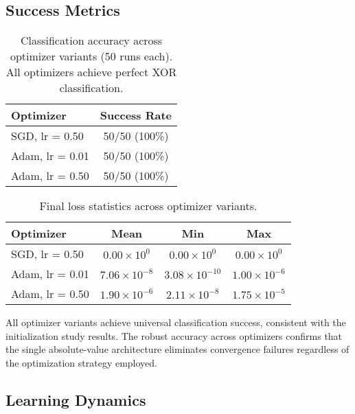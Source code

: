 
\subsection*{Success Metrics}

\begin{table}[ht]
\centering
\caption{Classification accuracy across optimizer variants (50 runs each). All optimizers achieve perfect XOR classification.}
\label{tab:abs1-opt-accuracy}
\begin{tabular}{lc}
\toprule
Optimizer & Success Rate \\
\midrule
SGD, lr = 0.50 & 50/50 (100\%) \\
Adam, lr = 0.01 & 50/50 (100\%) \\
Adam, lr = 0.50 & 50/50 (100\%) \\
\bottomrule
\end{tabular}
\end{table}

\begin{table}[ht]
\centering
\caption{Final loss statistics across optimizer variants.}
\label{tab:abs1-opt-loss}
\begin{tabular}{lccc}
\toprule
Optimizer & Mean & Min & Max \\
\midrule
SGD, lr = 0.50 & $0.00 \times 10^{0}$ & $0.00 \times 10^{0}$ & $0.00 \times 10^{0}$ \\
Adam, lr = 0.01 & $7.06 \times 10^{-8}$ & $3.08 \times 10^{-10}$ & $1.00 \times 10^{-6}$ \\
Adam, lr = 0.50 & $1.90 \times 10^{-6}$ & $2.11 \times 10^{-8}$ & $1.75 \times 10^{-5}$ \\
\bottomrule
\end{tabular}
\end{table}

All optimizer variants achieve universal classification success, consistent with the initialization study results. The robust accuracy across optimizers confirms that the single absolute-value architecture eliminates convergence failures regardless of the optimization strategy employed.


\subsection*{Learning Dynamics}

